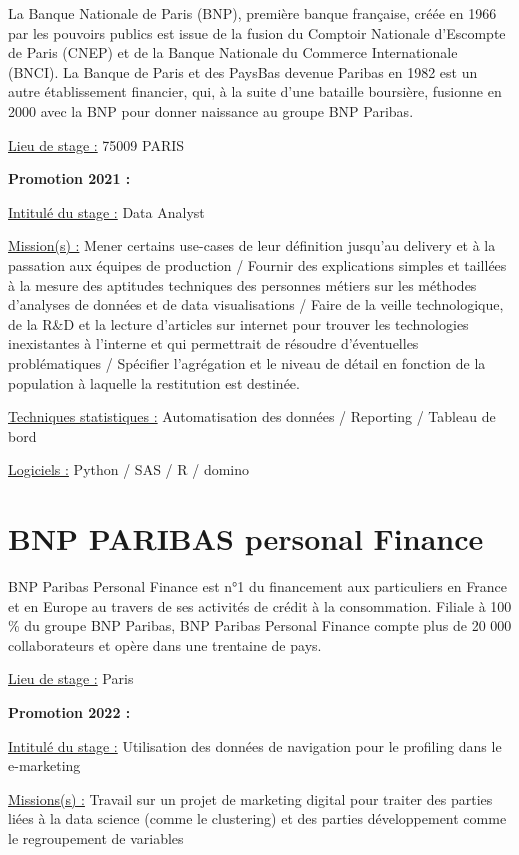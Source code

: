 \documentclass[
  letterpaper,
  DIV=11,
  numbers=noendperiod]{scrreprt}
\begin{document}
La Banque Nationale de Paris (BNP), première banque française, créée en
1966 par les pouvoirs publics est issue de la fusion du Comptoir
Nationale d'Escompte de Paris (CNEP) et de la Banque Nationale du
Commerce Internationale (BNCI). La Banque de Paris et des PaysBas
devenue Paribas en 1982 est un autre établissement financier, qui, à la
suite d'une bataille boursière, fusionne en 2000 avec la BNP pour donner
naissance au groupe BNP Paribas.

\uline{Lieu de stage :} 75009 PARIS

\textbf{Promotion 2021 :}

\uline{Intitulé du stage :} Data Analyst

\uline{Mission(s) :} Mener certains use-cases de leur définition
jusqu'au delivery et à la passation aux équipes de production / Fournir
des explications simples et taillées à la mesure des aptitudes
techniques des personnes métiers sur les méthodes d'analyses de données
et de data visualisations / Faire de la veille technologique, de la R\&D
et la lecture d'articles sur internet pour trouver les technologies
inexistantes à l'interne et qui permettrait de résoudre d'éventuelles
problématiques / Spécifier l'agrégation et le niveau de détail en
fonction de la population à laquelle la restitution est destinée.

\uline{Techniques statistiques :} Automatisation des données / Reporting
/ Tableau de bord

\uline{Logiciels :} Python / SAS / R / domino

\hypertarget{bnp-paribas-personal-finance}{%
\section{\texorpdfstring{\textbf{BNP PARIBAS personal
Finance}}{BNP PARIBAS personal Finance}}\label{bnp-paribas-personal-finance}}

BNP Paribas Personal Finance est n°1 du financement aux particuliers en
France et en Europe au travers de ses activités de crédit à la
consommation. Filiale à 100 \% du groupe BNP Paribas, BNP Paribas
Personal Finance compte plus de 20 000 collaborateurs et opère dans une
trentaine de pays.

\uline{Lieu de stage :} Paris

\textbf{Promotion 2022 :}

\uline{Intitulé du stage :} Utilisation des données de navigation pour
le profiling dans le e-marketing

\uline{Missions(s) :} Travail sur un projet de marketing digital pour
traiter des parties liées à la data science (comme le clustering) et des
parties développement comme le regroupement de variables
\end{document}
